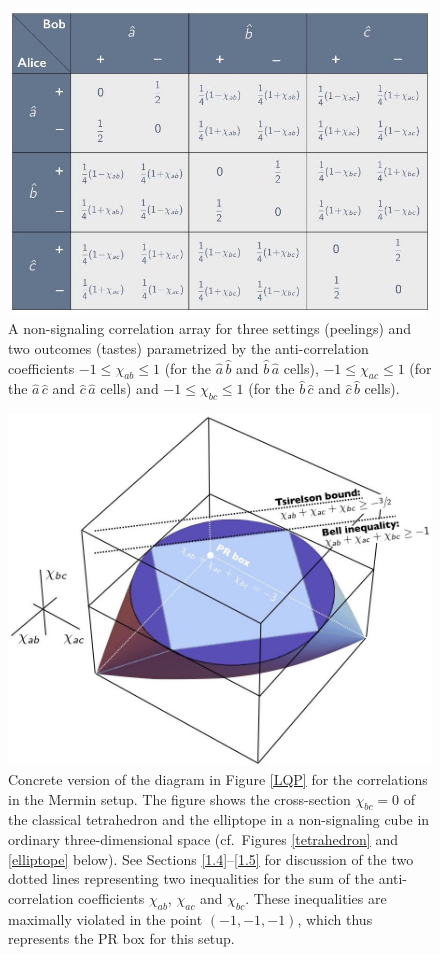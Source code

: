 \begin{figure}[ht]
 \centering
   \includegraphics[width=4.5in]{CA-3set2out-non-signaling-chis.jpeg} 
   \caption{A non-signaling correlation array for three settings (peelings) and two outcomes (tastes) parametrized by the anti-correlation coefficients $-1 \le \chi_{ab} \le 1$ (for the $\hat{a} \, \hat{b}$ and  $\hat{b} \, \hat{a}$ cells), $-1 \le \chi_{ac} \le 1$ (for the $\hat{a} \, \hat{c}$ and  $\hat{c} \, \hat{a}$ cells) and $-1 \le \chi_{bc} \le 1$ (for the $\hat{b} \, \hat{c}$ and  $\hat{c} \, \hat{b}$ cells).}
   \label{CA-3set2out-non-signaling-chis}
\end{figure}

\begin{figure}[ht]
\centering
\includegraphics[width=4.6in]{elliptope-LQPslice.jpeg}
\caption{Concrete version of the diagram in Figure \ref{LQP} for the correlations in the Mermin setup. The figure shows the cross-section $\chi_{bc} =0$ of the classical tetrahedron and the elliptope in a non-signaling cube in ordinary three-dimensional space (cf.\ Figures \ref{tetrahedron} and \ref{elliptope} below). See Sections  \ref{1.4}--\ref{1.5} for discussion of the two dotted lines representing two inequalities for the sum of the anti-correlation coefficients $\chi_{ab}$, $\chi_{ac}$ and $\chi_{bc}$. These inequalities are maximally violated in the point $(-1, -1, -1)$, which thus represents the PR box for this setup.}
   \label{elliptope-LQPslice}
\end{figure} 


